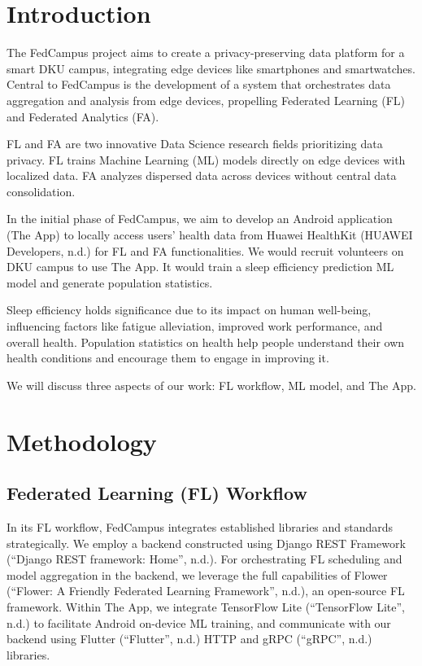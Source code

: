 \documentclass{article}
\begin{document}
\setlength{\columnsep}{0.25in}
\begin{multicols}{2}
\section{Introduction}

The FedCampus project aims to create a privacy-preserving data platform
for a smart DKU campus, integrating edge devices like smartphones and
smartwatches. Central to FedCampus is the development of a system that
orchestrates data aggregation and analysis from edge devices, propelling
Federated Learning (FL) and Federated Analytics (FA).

FL and FA are two innovative Data Science research fields prioritizing
data privacy. FL trains Machine Learning (ML) models directly on edge
devices with localized data. FA analyzes dispersed data across devices
without central data consolidation.

In the initial phase of FedCampus, we aim to develop an Android
application (The App) to locally access users' health
data from Huawei HealthKit (HUAWEI Developers, n.d.) for FL and FA
functionalities. We would recruit volunteers on DKU campus to use The
App. It would train a sleep efficiency prediction ML model and generate
population statistics.

Sleep efficiency holds significance due to its impact on human
well-being, influencing factors like fatigue alleviation, improved work
performance, and overall health. Population statistics on health help
people understand their own health conditions and encourage them to
engage in improving it.

We will discuss three aspects of our work: FL workflow, ML model, and
The App.

\section{Methodology}

\subsection{Federated Learning (FL) Workflow}

In its FL workflow, FedCampus integrates established libraries and
standards strategically. We employ a backend constructed using Django
REST Framework (``Django REST framework: Home'', n.d.). For
orchestrating FL scheduling and model aggregation in the backend, we
leverage the full capabilities of Flower (``Flower: A Friendly Federated
Learning Framework'', n.d.), an open-source FL framework. Within The
App, we integrate TensorFlow Lite (``TensorFlow Lite'', n.d.) to
facilitate Android on-device ML training, and communicate with our
backend using Flutter (``Flutter'', n.d.) HTTP and gRPC (``gRPC'', n.d.)
libraries.


\end{multicols}
\end{document}
